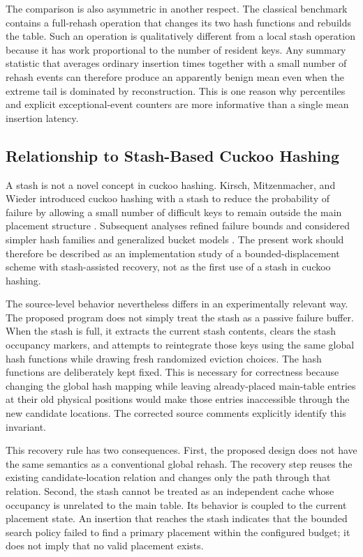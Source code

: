 \documentclass[conference]{IEEEtran}
\begin{document}
The comparison is also asymmetric in another respect. The classical benchmark
contains a full-rehash operation that changes its two hash functions and
rebuilds the table. Such an operation is qualitatively different from a local
stash operation because it has work proportional to the number of resident
keys. Any summary statistic that averages ordinary insertion times together
with a small number of rehash events can therefore produce an apparently
benign mean even when the extreme tail is dominated by reconstruction. This is
one reason why percentiles and explicit exceptional-event counters are more
informative than a single mean insertion latency.

\subsection{Relationship to Stash-Based Cuckoo Hashing}
\label{subsec:discussion_stash}

A stash is not a novel concept in cuckoo hashing. Kirsch, Mitzenmacher, and
Wieder introduced cuckoo hashing with a stash to reduce the probability of
failure by allowing a small number of difficult keys to remain outside the
main placement structure \cite{kirsch2009stash}. Subsequent analyses refined
failure bounds and considered simpler hash families and generalized bucket
models \cite{kutzelnigg2010stash,aumuller2014explicit,minaud2023generalized,noble2021explicit}.
The present work should therefore be described as an implementation study of
a bounded-displacement scheme with stash-assisted recovery, not as the first
use of a stash in cuckoo hashing.

The source-level behavior nevertheless differs in an experimentally relevant
way. The proposed program does not simply treat the stash as a passive
failure buffer. When the stash is full, it extracts the current stash contents,
clears the stash occupancy markers, and attempts to reintegrate those keys
using the same global hash functions while drawing fresh randomized eviction
choices. The hash functions are deliberately kept fixed. This is necessary
for correctness because changing the global hash mapping while leaving
already-placed main-table entries at their old physical positions would make
those entries inaccessible through the new candidate locations. The corrected
source comments explicitly identify this invariant.

This recovery rule has two consequences. First, the proposed design does not
have the same semantics as a conventional global rehash. The recovery step
reuses the existing candidate-location relation and changes only the path
through that relation. Second, the stash cannot be treated as an independent
cache whose occupancy is unrelated to the main table. Its behavior is coupled
to the current placement state. An insertion that reaches the stash indicates
that the bounded search policy failed to find a primary placement within the
configured budget; it does not imply that no valid placement exists.
\end{document}
